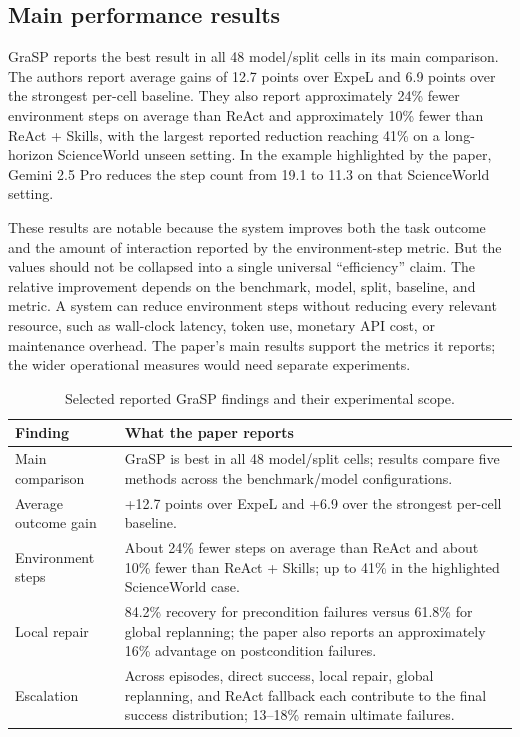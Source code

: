\subsection{Main performance results}

GraSP reports the best result in all 48 model/split cells in its main comparison. The authors report average gains of 12.7 points over ExpeL and 6.9 points over the strongest per-cell baseline. They also report approximately 24\% fewer environment steps on average than ReAct and approximately 10\% fewer than ReAct + Skills, with the largest reported reduction reaching 41\% on a long-horizon ScienceWorld unseen setting. In the example highlighted by the paper, Gemini 2.5 Pro reduces the step count from 19.1 to 11.3 on that ScienceWorld setting.\autocite{xia2026grasp}

These results are notable because the system improves both the task outcome and the amount of interaction reported by the environment-step metric. But the values should not be collapsed into a single universal “efficiency” claim. The relative improvement depends on the benchmark, model, split, baseline, and metric. A system can reduce environment steps without reducing every relevant resource, such as wall-clock latency, token use, monetary API cost, or maintenance overhead. The paper's main results support the metrics it reports; the wider operational measures would need separate experiments.

\begin{table}[tbp]
\centering
\caption{Selected reported GraSP findings and their experimental scope.}
\label{tab:ch17-grasp-findings}
\small
\begin{tabularx}{\textwidth}{P{0.29\textwidth}X}
\toprule
\textbf{Finding} & \textbf{What the paper reports} \\
\midrule
Main comparison & GraSP is best in all 48 model/split cells; results compare five methods across the benchmark/model configurations. \\
Average outcome gain & +12.7 points over ExpeL and +6.9 over the strongest per-cell baseline. \\
Environment steps & About 24\% fewer steps on average than ReAct and about 10\% fewer than ReAct + Skills; up to 41\% in the highlighted ScienceWorld case. \\
Local repair & 84.2\% recovery for precondition failures versus 61.8\% for global replanning; the paper also reports an approximately 16\% advantage on postcondition failures. \\
Escalation & Across episodes, direct success, local repair, global replanning, and ReAct fallback each contribute to the final success distribution; 13--18\% remain ultimate failures. \\
\bottomrule
\end{tabularx}
\end{table}

